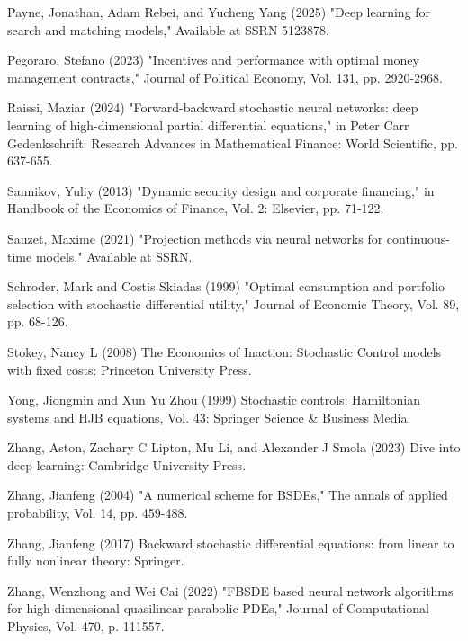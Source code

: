 \documentclass{article}
\begin{document}
\begin{thebibliography}{99}
 Payne, Jonathan, Adam Rebei, and Yucheng Yang (2025) "Deep learning for search and matching models," Available at SSRN 5123878.

 Pegoraro, Stefano (2023) "Incentives and performance with optimal money management contracts," Journal of Political Economy, Vol. 131, pp. 2920-2968.

 Raissi, Maziar (2024) "Forward-backward stochastic neural networks: deep learning of high-dimensional partial differential equations," in Peter Carr Gedenkschrift: Research Advances in Mathematical Finance: World Scientific, pp. 637-655.

 Sannikov, Yuliy (2013) "Dynamic security design and corporate financing," in Handbook of the Economics of Finance, Vol. 2: Elsevier, pp. 71-122.

 Sauzet, Maxime (2021) "Projection methods via neural networks for continuous-time models," Available at SSRN.

 Schroder, Mark and Costis Skiadas (1999) "Optimal consumption and portfolio selection with stochastic differential utility," Journal of Economic Theory, Vol. 89, pp. 68-126.

 Stokey, Nancy L (2008) The Economics of Inaction: Stochastic Control models with fixed costs: Princeton University Press.

\clearpage

 Yong, Jiongmin and Xun Yu Zhou (1999) Stochastic controls: Hamiltonian systems and HJB equations, Vol. 43: Springer Science \& Business Media.

 Zhang, Aston, Zachary C Lipton, Mu Li, and Alexander J Smola (2023) Dive into deep learning: Cambridge University Press.

 Zhang, Jianfeng (2004) "A numerical scheme for BSDEs," The annals of applied probability, Vol. 14, pp. 459-488.

 Zhang, Jianfeng (2017) Backward stochastic differential equations: from linear to fully nonlinear theory: Springer.

 Zhang, Wenzhong and Wei Cai (2022) "FBSDE based neural network algorithms for high-dimensional quasilinear parabolic PDEs," Journal of Computational Physics, Vol. 470, p. 111557.

\end{thebibliography}
\end{document}
